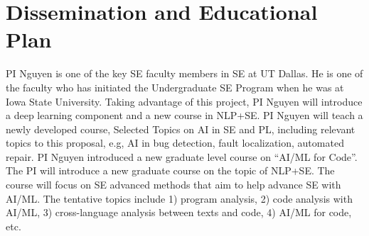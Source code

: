\section{Dissemination and Educational Plan}
\label{edu}



PI Nguyen is one of the key SE faculty members in SE at UT Dallas. 
%
He is one of the faculty who has initiated the
Undergraduate SE Program when he was at Iowa State University.
Taking advantage of this project, PI Nguyen will introduce a deep
learning component and a new course in NLP+SE.
PI Nguyen will teach a newly developed course, 
Selected Topics on AI in SE and PL,
including relevant topics to this proposal, e.g, 
AI in bug detection, fault localization, automated repair. 
PI Nguyen introduced a new graduate level course on ``AI/ML for
Code''. The PI will introduce a new graduate course on the topic of
NLP+SE.
The course will focus on SE advanced methods that
aim to help advance SE with AI/ML. 
The tentative topics include 1) program analysis, 2) code
analysis with AI/ML, 3) cross-language analysis between texts and code,
4) AI/ML for code, etc.



